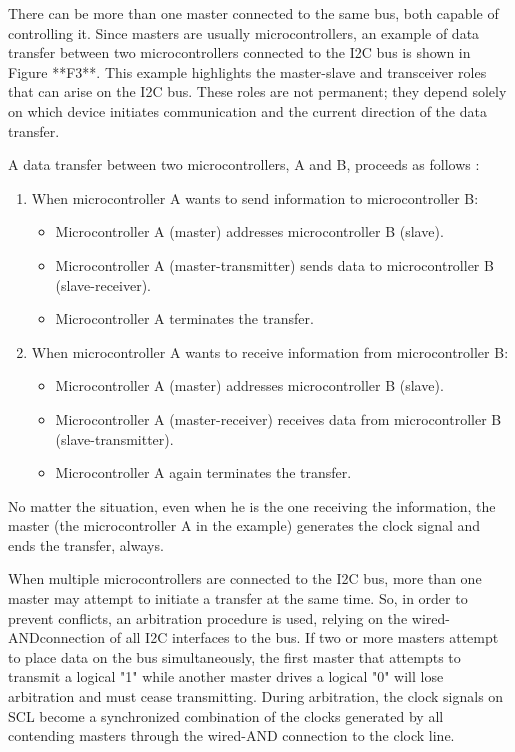 There can be more than one master connected to the same bus, both capable 
of controlling it. Since masters are usually microcontrollers, an example of data 
transfer between two microcontrollers connected to the I2C bus is shown in Figure **F3**. 
This example highlights the master-slave and transceiver roles that can 
arise on the I2C bus. These roles are not permanent; they depend solely on which 
device initiates communication and the current direction of the data transfer.

A data transfer between two microcontrollers, A and B, proceeds as follows \cite{I2CSpec2000}:

\begin{enumerate}
    \item When microcontroller A wants to send information to microcontroller B:
    \begin{itemize}
        \item Microcontroller A (master) addresses microcontroller B (slave).
        \item Microcontroller A (master-transmitter) sends data to microcontroller B (slave-receiver).
        \item Microcontroller A terminates the transfer.
    \end{itemize}

    \item When microcontroller A wants to receive information from microcontroller B:
    \begin{itemize}
            \item Microcontroller A (master) addresses microcontroller B (slave).
            \item Microcontroller A (master-receiver) receives data from microcontroller B (slave-transmitter).
            \item Microcontroller A again terminates the transfer.
    \end{itemize}
\end{enumerate}

No matter the situation, even when he is the one receiving the information, the 
master (the microcontroller A in the example) generates the clock signal and ends 
the transfer, always.

When multiple microcontrollers are connected to the I2C bus, more than one 
master may attempt to initiate a transfer at the same time. So, in order to prevent 
conflicts, an arbitration procedure is used, relying on the wired-AND\footnotemark[1] connection of 
all I2C interfaces to the bus. If two or more masters attempt to place data on the 
bus simultaneously, the first master that attempts to transmit a logical "1" while 
another master drives a logical "0" will lose arbitration and must cease transmitting. 
During arbitration, the clock signals on SCL become a synchronized combination of 
the clocks generated by all contending masters through the wired-AND connection 
to the clock line.


